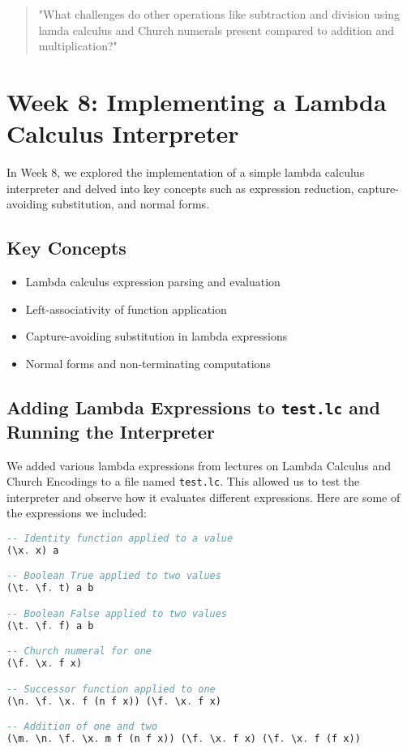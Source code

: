 \documentclass{article}
\begin{document}
\begin{quote}
\small
"What challenges do other operations like subtraction and division using lamda calculus and Church numerals present compared to addition and multiplication?"
\end{quote}

\section{Week 8: Implementing a Lambda Calculus Interpreter}
\label{sec:week8}

In Week 8, we explored the implementation of a simple lambda calculus interpreter and delved into key concepts such as expression reduction, capture-avoiding substitution, and normal forms.

\subsection*{Key Concepts}

\begin{itemize}
    \item Lambda calculus expression parsing and evaluation
    \item Left-associativity of function application
    \item Capture-avoiding substitution in lambda expressions
    \item Normal forms and non-terminating computations
\end{itemize}

\subsection*{Adding Lambda Expressions to \texttt{test.lc} and Running the Interpreter}

We added various lambda expressions from lectures on Lambda Calculus and Church Encodings to a file named \texttt{test.lc}. This allowed us to test the interpreter and observe how it evaluates different expressions. Here are some of the expressions we included:

\begin{lstlisting}[language=Haskell]
-- Identity function applied to a value
(\x. x) a

-- Boolean True applied to two values
(\t. \f. t) a b

-- Boolean False applied to two values
(\t. \f. f) a b

-- Church numeral for one
(\f. \x. f x)

-- Successor function applied to one
(\n. \f. \x. f (n f x)) (\f. \x. f x)

-- Addition of one and two
(\m. \n. \f. \x. m f (n f x)) (\f. \x. f x) (\f. \x. f (f x))
\end{lstlisting}
\end{document}
